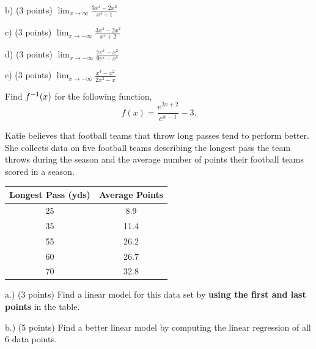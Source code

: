 \documentclass[11pt]{article}
\newcommand{\inv}{\ensuremath ^{-1}}
\begin{document}
\begin{questions}
\vspace{1.25in}

b) (3 points)  $\displaystyle \lim_{x\to\infty} \frac{3x^4 - 2x^2}{x^3 +1}$

\vspace{1.25in}

c)  (3 points)  $\displaystyle \lim_{x\to-\infty} \frac{3x^4 - 2x^2}{x^5 +2}$

\vspace{1.25in}

d) (3 points) $\displaystyle \lim_{x\to-\infty} \frac{7e^x - x^2}{9e^x -x^7}$

\vspace{1.25in}

e)  (3 points) $\displaystyle \lim_{x\to-\infty} \frac{x^3 - x^2}{2x^3 -x}$

\vspace{1.25in}


\question[10] Find $f\inv(x)$ for the following function,
\[f(x) = \frac{e^{2x+2}}{e^{x-1}} - 3.\]

\vspace{3.25in}


\question[15] Katie believes that football teams that throw long passes tend to perform better.  She collects data on five football teams describing the longest pass the team throws during the season and the average number of points their football teams scored in a season.  \\
\begin{center}
  \begin{tabular}{| c | c |}
    \hline
    Longest Pass (yds) & Average Points \\ \hline \hline
    25 & 8.9  \\ \hline
    35 & 11.4  \\ \hline
    55 & 26.2  \\ \hline
    60 & 26.7  \\ \hline
    70 & 32.8  \\ \hline
  \end{tabular}
\end{center}

a.) (3 points) Find a linear model for this data set by \textbf{using the first and last points} in the table.
\vspace{1.5in}

b.) (5 points) Find a better linear model by computing the linear regression of all 6 data points.
\vspace{1in}



\end{questions}
\end{document}
